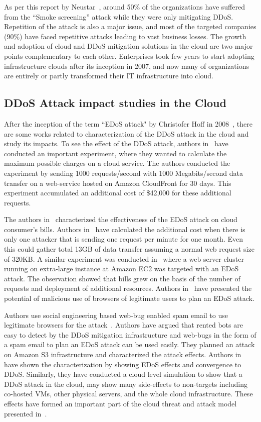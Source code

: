 \documentclass[final,5p,times,twocolumn]{elsarticle}
\begin{document}
\noindent As per this report by Neustar~\cite{neustar}, around 50\% of the organizations have suffered from the ``Smoke screening'' attack while they were only mitigating DDoS. Repetition of the attack is also a major issue, and most of the targeted companies (90\%) have faced repetitive attacks leading to vast business losses. The growth and adoption of cloud and DDoS mitigation solutions in the cloud are two major points complementary to each other. Enterprises took few years to start adopting infrastructure clouds after its inception in 2007, and now many of organizations are entirely or partly transformed their IT infrastructure into cloud. 



\subsection{DDoS Attack impact studies in the Cloud}
After the inception of the term ``EDoS attack" by Christofer Hoff in 2008~\cite{cohen}, there are some works related to characterization of the DDoS attack in the cloud and study its impacts. To see the effect of the DDoS attack, authors in~\cite{cloudfront} have conducted an important experiment, where they wanted to calculate the maximum possible charges on a cloud service. The authors conducted the experiment by sending 1000 requests/second with 1000 Megabits/second data transfer on a web-service hosted on Amazon CloudFront for 30 days. This experiment accumulated an additional cost of \$42,000 for these additional requests. 

The authors in~\cite{Idziorek11} characterized the effectiveness of the EDoS attack on cloud consumer's bills. Authors in~\cite{Idziorek11} have calculated the additional cost when there is only one attacker that is sending one request per minute for one month. Even this could gather total 13GB of data transfer assuming a normal web request size of 320KB. A similar experiment was conducted in~\cite{vivin} where a web server cluster running on extra-large instance at Amazon EC2 was targeted with an EDoS attack. The observation showed that bills grew on the basis of the number of requests and deployment of additional resources. Authors in~\cite{vlajic2014web} have presented the potential of malicious use of browsers of legitimate users to plan an EDoS attack. 

Authors use social engineering based web-bug enabled spam email to use legitimate browsers for the attack~\cite{vlajic2014web}. Authors have argued that rented bots are easy to detect by the DDoS mitigation infrastructure and web-bugs in the form of a spam email to plan an EDoS attack can be used easily. They planned an attack on Amazon S3 infrastructure and characterized the attack effects. Authors in~\cite{somani2016ddos} have shown the characterization by showing EDoS effects and convergence to DDoS. Similarly, they have conducted a cloud level simulation to show that a DDoS attack in the cloud, may show many side-effects to non-targets including co-hosted VMs, other physical servers, and the whole cloud infrastructure. These effects have formed an important part of the cloud threat and attack model presented in~\cite{bookchapter}. 
\end{document}
